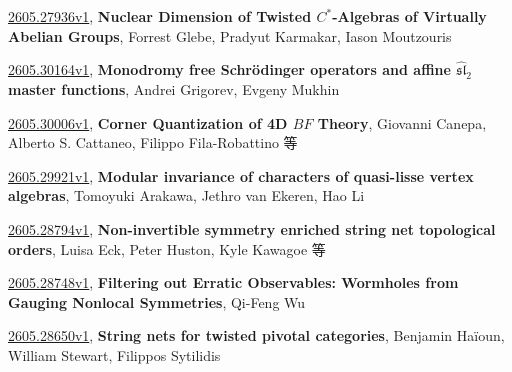 \documentclass[9pt, a4paper]{article}
\theoremstyle{plain}
\theoremstyle{definition}
\theoremstyle{remark}
\newcommand{\arxiv}[3]{\href{https://arxiv.org/abs/#1}{#1}, \textbf{\textcolor{arxivblue}{#2}}, #3}
\begin{document}
\arxiv{2605.27936v1}{Nuclear Dimension of Twisted $C^*$-Algebras of Virtually Abelian Groups}{Forrest Glebe, Pradyut Karmakar, Iason Moutzouris}

\arxiv{2605.30164v1}{Monodromy free Schrödinger operators and affine ${\widehat{\mathfrak{sl}}_2}$ master functions}{Andrei Grigorev, Evgeny Mukhin}

\arxiv{2605.30006v1}{Corner Quantization of 4D $BF$ Theory}{Giovanni Canepa, Alberto S. Cattaneo, Filippo Fila-Robattino 等}

\arxiv{2605.29921v1}{Modular invariance of characters of quasi-lisse vertex algebras}{Tomoyuki Arakawa, Jethro van Ekeren, Hao Li}

\arxiv{2605.28794v1}{Non-invertible symmetry enriched string net topological orders}{Luisa Eck, Peter Huston, Kyle Kawagoe 等}

\arxiv{2605.28748v1}{Filtering out Erratic Observables: Wormholes from Gauging Nonlocal Symmetries}{Qi-Feng Wu}

\arxiv{2605.28650v1}{String nets for twisted pivotal categories}{Benjamin Haïoun, William Stewart, Filippos Sytilidis}

\end{document}
